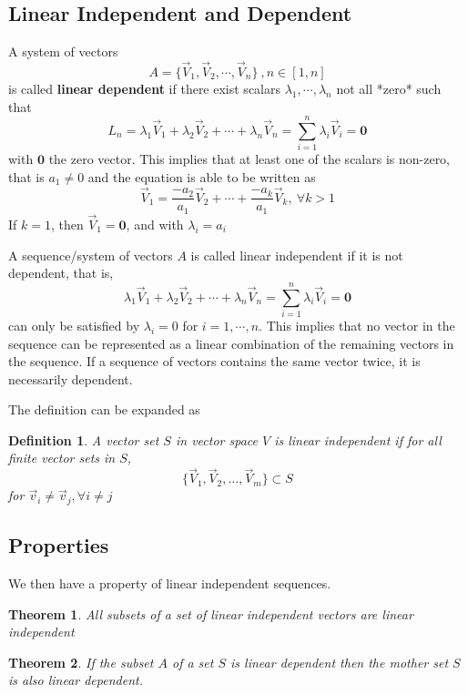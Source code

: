 \documentclass{book}
\newtheorem{Definition}{Definition}[section]
\newtheorem{Theorem}{Theorem}[section]
\numberwithin{identity}{subsection}
\numberwithin{Rule}{subsection}
\numberwithin{Theorem}{subsection}
\numberwithin{Definition}{subsection}
\begin{document}
\subsection{Linear Independent and Dependent}

A system of vectors $$A=\{\vec{V}_{1}, \vec{V}_{2},\cdots ,\vec{V}_{n} \}\: ,n \in [1,n]$$ is called \textbf{linear dependent} if there exist scalars $\lambda_{1}, \cdots, \lambda_{n}$ not all *zero* such that $$L_{n} = \lambda_{1} \vec{V}_{1}+ \lambda_{2}\vec{V}_{2}+\cdots+ \lambda_{n}\vec{V}_{n}=\sum\limits_{i=1}^{n}\lambda_{i}\vec{V}_{i}=\textbf{0}$$
with $\textbf{0}$ the zero vector. This implies that at least one of the scalars is non-zero, that is $a_{1}\neq 0$ and the equation is able to be written as $$\vec{V}_{1} = \frac{-a_{2}}{a_{1}}\vec{V}_{2}+\cdots+\frac{-a_{k}}{a_{1} }\vec{V}_{k},\:\forall k>1$$
If $k=1$, then $\vec{V}_{1}=\textbf{0}$, and with $\lambda_{i}=a_{i}$

A sequence/system of vectors $A$ is called linear independent if it is not dependent, that is, 
$$\lambda_{1} \vec{V}_{1}+ \lambda_{2}\vec{V}_{2}+\cdots+ \lambda_{n}\vec{V}_{n}=\sum\limits_{i=1}^{n}\lambda_{i}\vec{V}_{i}=\textbf{0}$$ can only be satisfied by $\lambda_{i}=0$ for $i = 1,\cdots,n$. This implies that no vector in the sequence can be represented as a linear combination of the remaining vectors in the sequence. If a sequence of vectors contains the same vector twice, it is necessarily dependent. 

The definition can be expanded as 

\begin{Definition}
    A vector set $S$ in vector space $V$ is linear independent if for all finite vector sets in $S$, $$\{ \vec{V}_{1}, \vec{V}_{2},\dots, \vec{V}_{m} \}\subset S$$ for $\vec{v}_{i}\neq \vec{v}_{j}, \forall i \neq j$
\end{Definition}

\subsection{Properties}

We then have a property of linear independent sequences. 

\begin{Theorem}
    All subsets of a set of linear independent vectors are linear independent
\end{Theorem}

\begin{Theorem}
    If the subset $A$ of a set $S$ is linear dependent then the mother set $S$ is also linear dependent. 
\end{Theorem}
\end{document}
